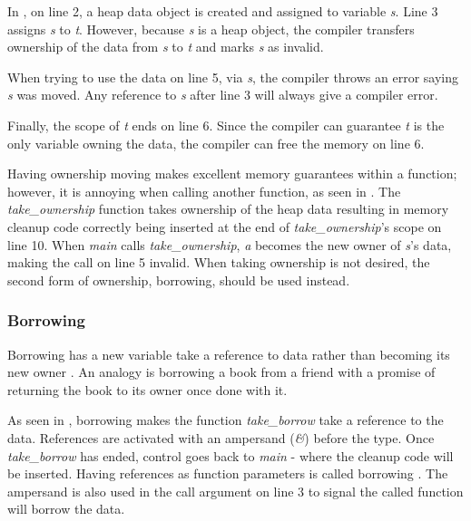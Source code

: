 
In , on line 2, a heap data object is created and assigned to variable \textit{s}.
Line 3 assigns \textit{s} to \textit{t}.
However, because \textit{s} is a heap object, the compiler transfers ownership of the data from \textit{s} to \textit{t} and marks \textit{s} as invalid.

When trying to use the data on line 5, via \textit{s}, the compiler throws an error saying \textit{s} was moved.
Any reference to \textit{s} after line 3 will always give a compiler error.

Finally, the scope of \textit{t} ends on line 6.
Since the compiler can guarantee \textit{t} is the only variable owning the data, the compiler can free the memory on line 6.


Having ownership moving makes excellent memory guarantees within a function; however, it is annoying when calling another function, as seen in .
The \textit{take\_ownership} function takes ownership of the heap data resulting in memory cleanup code correctly being inserted at the end of \textit{take\_ownership}'s scope on line 10.
When \textit{main} calls \textit{take\_ownership}, \textit{a} becomes the new owner of \textit{s}'s data, making the call on line 5 invalid.
When taking ownership is not desired, the second form of ownership, borrowing, should be used instead.

\subsubsection{Borrowing}

Borrowing has a new variable take a reference to data rather than becoming its new owner \cite{klabnik_2019_01}.
An analogy is borrowing a book from a friend with a promise of returning the book to its owner once done with it.


As seen in , borrowing makes the function \textit{take\_borrow} take a reference to the data.
References are activated with an ampersand (\textit{\&}) before the type.
Once \textit{take\_borrow} has ended, control goes back to \textit{main} - where the cleanup code will be inserted.
Having references as function parameters is called borrowing \cite{klabnik_2019_01}.
The ampersand is also used in the call argument on line 3 to signal the called function will borrow the data.


